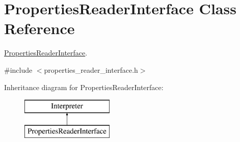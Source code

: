 \hypertarget{classPropertiesReaderInterface}{\section{Properties\-Reader\-Interface Class Reference}
\label{classPropertiesReaderInterface}
}


\hyperlink{classPropertiesReaderInterface}{Properties\-Reader\-Interface}.  




{\ttfamily \#include $<$properties\-\_\-reader\-\_\-interface.\-h$>$}

Inheritance diagram for Properties\-Reader\-Interface\-:\begin{figure}[H]
\begin{center}
\leavevmode
\includegraphics[height=2.000000cm]{classPropertiesReaderInterface}
\end{center}
\end{figure}
